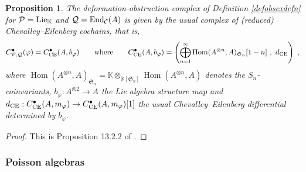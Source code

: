 \documentclass[11pt]{amsart}
\numberwithin{equation}{section}
\newtheorem{prop}[theo]{Proposition}
\theoremstyle{definition}
\newtheorem{defn}[theo]{Definition}
\newcommand{\bb}{\mathbb}
\newcommand{\mc}{\mathcal}
\newcommand{\mf}{\mathfrak}
\DeclareMathOperator{\Hom}{Hom}
\DeclareMathOperator{\Vect}{Vect}
\newcommand{\Mod}{{\textup{-Mod}}}
\newcommand{\K}{{\bb K}}
\newcommand{\End}{{\textup{End}}}
\newcommand{\into}{{\ \hookrightarrow\ }}
\newcommand{\Pois}{{\textup{Pois}}}
\newcommand{\Lie}{{\textup{Lie}}}
\newcommand{\ash}{{\textup{\mbox{!`}}}}
\newcommand{\Op}{{\textup{Op}}}
\newcommand{\Ss}{{{\mf{S}}}}
\newcommand{\0}{{\textbf{0}}}
\newcommand{\id}{{\textup{id}}}
\newcommand{\gr}{\textup{gr}}
\newcommand{\g}{{\mf{g}}}
\def \mf{\mathfrak}
\def \id{\mathbbm{1}}
\def \Op{\mathrm{Op}}
\begin{document}
\begin{prop}\label{CEcxprop}
	The deformation-obstruction complex of Definition \ref{defobscxdefn} for $\mc P=\Lie_\K$ and $\mc Q=\End_{\mc C}(A)$ is given by the usual complex of (reduced) Chevalley--Eilenberg cochains, that is,
	\[ C^\bullet_{\mc P,\mc Q}(\varphi) = C^\bullet_{\textup{CE}}(A,b_\varphi) \qquad \text{where}\qquad C^\bullet_{\textup{CE}}(A,b_\varphi) = \left( \bigoplus_{n=1}^\infty \Hom(A^{\otimes n}, A)_{\Ss_n}[1-n] \ , \ d_\textup{CE} \right)  \ , \]
	where $\Hom(A^{\otimes n}, A)_{\Ss_n}=\K \otimes_{\K[\Ss_n]}\Hom(A^{\otimes n}, A) $ denotes the $S_n$-coinvariants, $b_\varphi:A^{\otimes 2} \to A$ the Lie algebra structure map and $d_\text{CE}:C^\bullet_{\textup{CE}}(A,m_\varphi)\to C^\bullet_{\textup{CE}}(A,m_\varphi)[1]$ the usual Chevalley--Eilenberg differential determined by $b_\varphi$.
\end{prop}
\begin{proof}
This is Proposition 13.2.2 of \cite{LV}.
	
\end{proof}





\subsubsection{Poisson algebras}

\end{document}
